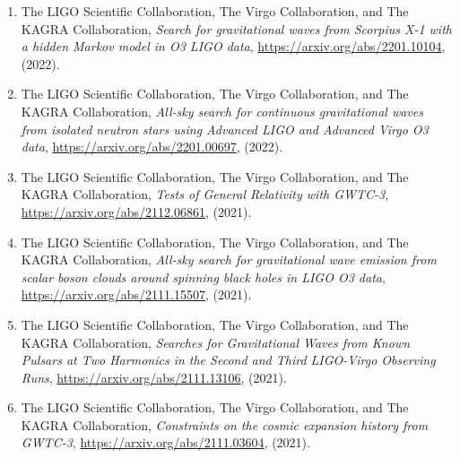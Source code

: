 \begin{enumerate}
\item The LIGO Scientific Collaboration, The Virgo Collaboration, and The KAGRA Collaboration, {\itshape Search for gravitational waves from Scorpius X-1 with a hidden Markov model in O3 LIGO data}, \href{https://arxiv.org/abs/2201.10104}{https://arxiv.org/abs/2201.10104}, (2022).
\item The LIGO Scientific Collaboration, The Virgo Collaboration, and The KAGRA Collaboration, {\itshape All-sky search for continuous gravitational waves from isolated neutron stars using Advanced LIGO and Advanced Virgo O3 data}, \href{https://arxiv.org/abs/2201.00697}{https://arxiv.org/abs/2201.00697}, (2022).
\item The LIGO Scientific Collaboration, The Virgo Collaboration, and The KAGRA Collaboration, {\itshape Tests of General Relativity with GWTC-3}, \href{https://arxiv.org/abs/2112.06861}{https://arxiv.org/abs/2112.06861}, (2021).
\item The LIGO Scientific Collaboration, The Virgo Collaboration, and The KAGRA Collaboration, {\itshape All-sky search for gravitational wave emission from scalar boson clouds around spinning black holes in LIGO O3 data}, \href{https://arxiv.org/abs/2111.15507}{https://arxiv.org/abs/2111.15507}, (2021).
\item The LIGO Scientific Collaboration, The Virgo Collaboration, and The KAGRA Collaboration, {\itshape Searches for Gravitational Waves from Known Pulsars at Two Harmonics in the Second and Third LIGO-Virgo Observing Runs}, \href{https://arxiv.org/abs/2111.13106}{https://arxiv.org/abs/2111.13106}, (2021).
\item The LIGO Scientific Collaboration, The Virgo Collaboration, and The KAGRA Collaboration, {\itshape Constraints on the cosmic expansion history from GWTC-3}, \href{https://arxiv.org/abs/2111.03604}{https://arxiv.org/abs/2111.03604}, (2021).
\end{enumerate}